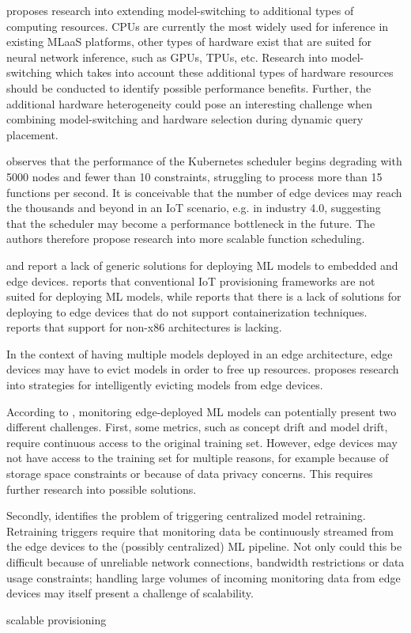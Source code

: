 \cite{Zhang2020} proposes research into extending model-switching to additional types of computing resources.
CPUs are currently the most widely used for inference in existing MLaaS platforms, other types of hardware exist that are suited for neural network inference, such as GPUs, TPUs, etc.
Research into model-switching which takes into account these additional types of hardware resources should be conducted to identify possible performance benefits.
Further, the additional hardware heterogeneity could pose an interesting challenge when combining model-switching and hardware selection during dynamic query placement.

\cite{Rausch2019a} observes that the performance of the Kubernetes scheduler begins degrading with 5000 nodes and fewer than 10 constraints, struggling to process more than 15 functions per second.
It is conceivable that the number of edge devices may reach the thousands and beyond in an IoT scenario, e.g. in industry 4.0, suggesting that the scheduler may become a performance bottleneck in the future.
The authors therefore propose research into more scalable function scheduling.

\cite{Bosch2021} and \cite{Rausch2019} report a lack of generic solutions for deploying ML models to embedded and edge devices.
\cite{Rausch2019} reports that conventional IoT provisioning frameworks are not suited for deploying ML models, while \cite{Gupta2020} reports that there is a lack of solutions for deploying to edge devices that do not support containerization techniques.
\cite{Rausch2019a} reports that support for non-x86 architectures is lacking.

In the context of having multiple models deployed in an edge architecture, edge devices may have to evict models in order to free up resources.
\cite{Rausch2019a} proposes research into strategies for intelligently evicting models from edge devices.

According to \cite{Rausch2019}, monitoring edge-deployed ML models can potentially present two different challenges.
First, some metrics, such as concept drift and model drift, require continuous access to the original training set.
However, edge devices may not have access to the training set for multiple reasons, for example because of storage space constraints or because of data privacy concerns.
This requires further research into possible solutions.

Secondly, \cite{Rausch2019} identifies the problem of triggering centralized model retraining.
Retraining triggers require that monitoring data be continuously streamed from the edge devices to the (possibly centralized) ML pipeline.
Not only could this be difficult because of unreliable network connections, bandwidth restrictions or data usage constraints; handling large volumes of incoming monitoring data from edge devices may itself present a challenge of scalability.

\cite{Rausch2019} scalable provisioning